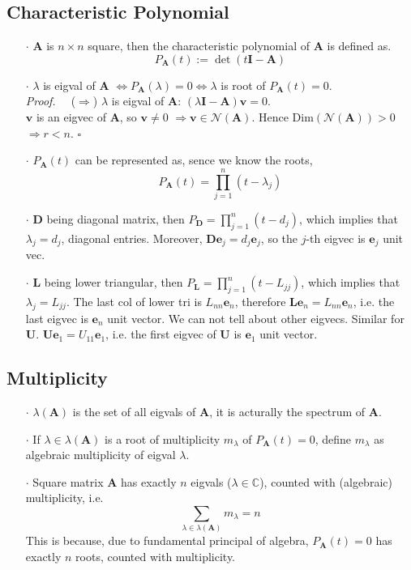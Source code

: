 \documentclass[a4paper, 11pt]{article}
\begin{document}
\subsection{Characteristic Polynomial}
\begin{itemize}
  \item[$\cdot$] $\bm{A}$ is $n\times n$ square, then the characteristic polynomial of $\bm{A}$ is defined as.
  $$
  P_{\bm{A}}(t):=\det(t \bm{I} - \bm{A})
  $$
  \item[$\cdot$]$\lambda$ is eigval of $\bm{A}$ $\iff P_{\bm{A}}(\lambda) = 0\iff \lambda$ is root of $P_{\bm{A}}(t)=0$.\\
  \textit{Proof.~~} ($\Rightarrow$) $\lambda$ is eigval of $\bm{A}$: $(\lambda \bm{I}-\bm{A})\bm{v}=0$. \\
  $\bm{v}$ is an eigvec of $\bm{A}$, so $\bm{v}\ne 0$ $\Rightarrow \bm{v}\in \mathcal{N}(\bm{A})$.
  Hence $\text{Dim}(\mathcal{N}(\bm{A}))>0$ $\Rightarrow r<n$. $\square$

  \item[$\cdot$] $P_{\bm{A}}(t)$ can be represented as, sence we know the roots, 
  $$
  P_{\bm{A}}(t) = \prod_{j=1}^n (t- \lambda_j)
  $$
  \item[$\cdot$] $\bm{D}$ being diagonal matrix, then $P_{\bm{D}} = \prod_{j=1}^n (t- d_j)$, which implies that $\lambda_j = d_j$, diagonal entries. Moreover, $\bm{D}\bm{e}_j = d_j \bm{e}_j$, so the $j$-th eigvec is $\bm{e}_j$ unit vec.
  \item[$\cdot$] $\bm{L}$ being lower triangular, then $P_{\bm{L}} = \prod_{j=1}^n (t- L_{jj})$, which implies that $\lambda_j = L_{jj}$. The last col of lower tri is $L_{nn} \bm{e}_n$, therefore $\bm{L}\bm{e}_n = L_{nn}\bm{e}_n$, i.e. the last eigvec is $\bm{e}_n$ unit vector. We can not tell about other eigvecs. Similar for $\bm{U}$. $\bm{U}\bm{e}_1 = U_{11}\bm{e}_1$, i.e. the first eigvec of $\bm{U}$ is $\bm{e}_1$ unit vector.
\end{itemize}

\subsection{Multiplicity}
\begin{itemize}
  \item[$\cdot$] $\lambda(\bm{A})$ is the set of all eigvals of $\bm{A}$, it is acturally the spectrum of $\bm{A}$.
  \item[$\cdot$] If $\lambda \in \lambda(\bm{A})$ is a root of multiplicity $m_{\lambda}$ of $P_{\bm{A}}(t)=0$, define $m_{\lambda}$ as algebraic multiplicity of eigval $\lambda$.
  \item[$\cdot$] Square matrix $\bm{A}$ has exactly $n$ eigvals ($\lambda\in \mathbb{C}$), counted with (algebraic) multiplicity, i.e.
  $$
  \sum_{\lambda \in \lambda(\bm{A})} m_{\lambda} = n
  $$
  This is because, due to fundamental principal of algebra, $P_{\bm{A}}(t)=0$ has exactly $n$ roots, counted with multiplicity.
\end{itemize}
\end{document}
